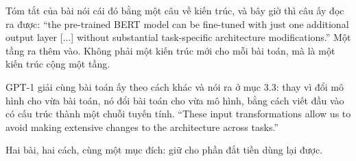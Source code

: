Tóm tắt của bài nói cái đó bằng một câu về kiến trúc, và bây giờ thì câu ấy đọc
ra được: \enquote{the pre-trained BERT model can be fine-tuned with just one
additional output layer [...] without substantial task-specific architecture
modifications.} Một tầng ra thêm vào. Không phải một kiến trúc mới cho mỗi bài
toán, mà là một kiến trúc cộng một tầng.

GPT-1 giải cùng bài toán ấy theo cách khác và nói ra ở mục 3.3: thay vì đổi mô
hình cho vừa bài toán, nó đổi bài toán cho vừa mô hình, bằng cách viết đầu vào
có cấu trúc thành một chuỗi tuyến tính. \enquote{These input transformations
allow us to avoid making extensive changes to the architecture across tasks.}

Hai bài, hai cách, cùng một mục đích: giữ cho phần đắt tiền dùng lại được.

